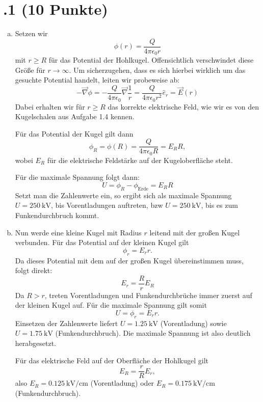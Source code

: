 \section*{\nr.1 \titone (10 Punkte)}
\begin{enumerate}[(a)]
\item Setzen wir  
\begin{equation}
\phi (r) = \frac{Q}{4\pi\epsilon_0 r}
\end{equation}
mit $r\geq R$ für das Potential der Hohlkugel. Offensichtlich verschwindet diese Größe für $r \to \infty$. Um sicherzugehen, dass es sich hierbei wirklich um das gesuchte Potential handelt, leiten wir probeweise ab:
\begin{equation}
-\vec{\nabla} \phi = -\frac{Q}{4\pi\epsilon_0} \vec{\nabla} \frac{1}{r} = \frac{Q}{4\pi\epsilon_0 r^2} \hat{e}_r = \vec{E}(r)
\end{equation}
Dabei erhalten wir für $r\geq R$ das korrekte elektrische Feld, wie wir es von den Kugelschalen aus Aufgabe 1.4 kennen.

Für das Potential der Kugel gilt dann
\begin{equation}
\phi_R = \phi (R) = \frac{Q}{4\pi\epsilon_0 R} = E_R R,
\end{equation} 
wobei $E_R$ für die elektrische Feldstärke auf der Kugeloberfläche steht.

Für die maximale Spannung folgt dann:
\begin{equation}
U = \phi_R -\phi_\text{Erde} = E_R R
\end{equation}
Setzt man die Zahlenwerte ein, so ergibt sich als maximale Spannung $U=\SI{250}{\kilo\volt}$, bis Vorentladungen auftreten, bzw $U=\SI{250}{\kilo\volt}$, bis es zum Funkendurchbruch kommt.

\item 
Nun werde eine kleine Kugel mit Radius $r$ leitend mit der großen Kugel verbunden. Für das Potential auf der kleinen Kugel gilt
\begin{equation}
\phi_r = E_r r.
\end{equation}
Da dieses Potential mit dem auf der großen Kugel übereinstimmen muss, folgt direkt:
\begin{equation}
E_r = \frac{R}{r}E_R
\end{equation}
Da $R>r$, treten Vorentladungen und Funkendurchbrüche immer zuerst auf der kleinen Kugel auf. Für die maximale Spannung gilt somit
\begin{equation}
U = \phi_r = E_r r.
\end{equation}
Einsetzen der Zahlenwerte liefert $U=\SI{1.25}{\kilo\volt}$ (Vorentladung) sowie $U=\SI{1.75}{\kilo\volt}$ (Funkendurchbruch). Die maximale Spannung ist also deutlich herabgesetzt.

Für das elektrische Feld auf der Oberfläche der Hohlkugel gilt
\begin{equation}
E_R = \frac{r}{R} E_r,
\end{equation}
also $E_R = \SI{0.125}{\kilo\volt\per\centi\meter}$ (Vorentladung) oder $E_R = \SI{0.175}{\kilo\volt\per\centi\meter}$ (Funkendurchbruch). 
\end{enumerate}